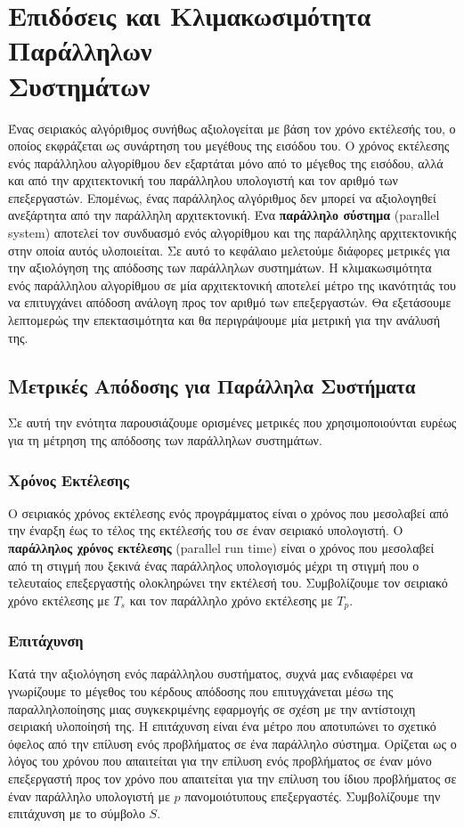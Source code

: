 \documentclass[12pt,a4paper]{article} %
\begin{document}
\section[Επιδόσεις και Κλιμακωσιμότητα Παράλληλων Συστημάτων]{Επιδόσεις και Κλιμακωσιμότητα Παράλληλων \protect\\ Συστημάτων}
Ένας σειριακός αλγόριθμος συνήθως αξιολογείται με βάση τον χρόνο εκτέλεσής 
του, ο οποίος εκφράζεται ως συνάρτηση του μεγέθους της εισόδου του. Ο 
χρόνος εκτέλεσης ενός παράλληλου αλγορίθμου δεν εξαρτάται μόνο από το 
μέγεθος της εισόδου, αλλά και από την αρχιτεκτονική του παράλληλου 
υπολογιστή και τον αριθμό των επεξεργαστών. Επομένως, ένας παράλληλος 
αλγόριθμος δεν μπορεί να αξιολογηθεί ανεξάρτητα από την παράλληλη 
αρχιτεκτονική. Ένα \textbf{παράλληλο σύστημα} 
(parallel system) αποτελεί τον συνδυασμό ενός 
αλγορίθμου και της παράλληλης αρχιτεκτονικής στην οποία αυτός υλοποιείται.
Σε αυτό το κεφάλαιο μελετούμε διάφορες μετρικές για την αξιολόγηση της 
απόδοσης των παράλληλων συστημάτων.
Η κλιμακωσιμότητα ενός παράλληλου αλγορίθμου σε μία αρχιτεκτονική
αποτελεί μέτρο της ικανότητάς του να επιτυγχάνει απόδοση ανάλογη προς τον 
αριθμό των επεξεργαστών. Θα εξετάσουμε λεπτομερώς την επεκτασιμότητα
και θα περιγράψουμε μία μετρική για την ανάλυσή της.

\subsection{Μετρικές Απόδοσης για Παράλληλα Συστήματα}
Σε αυτή την ενότητα παρουσιάζουμε ορισμένες μετρικές που χρησιμοποιούνται 
ευρέως για τη μέτρηση της απόδοσης των παράλληλων συστημάτων.

\subsubsection{Χρόνος Εκτέλεσης}
Ο σειριακός χρόνος εκτέλεσης ενός προγράμματος είναι ο χρόνος που 
μεσολαβεί από την έναρξη έως το τέλος της εκτέλεσής του σε έναν σειριακό 
υπολογιστή. Ο \textbf{παράλληλος χρόνος εκτέλεσης}
(parallel run time) είναι ο χρόνος που 
μεσολαβεί από τη στιγμή που ξεκινά ένας παράλληλος υπολογισμός μέχρι τη 
στιγμή που ο τελευταίος επεξεργαστής ολοκληρώνει την εκτέλεσή του.
Συμβολίζουμε τον σειριακό χρόνο εκτέλεσης με $T_s$ και τον παράλληλο 
χρόνο εκτέλεσης με $T_p$.

\subsubsection{Επιτάχυνση}
Κατά την αξιολόγηση ενός παράλληλου συστήματος, συχνά μας ενδιαφέρει να
γνωρίζουμε το μέγεθος του κέρδους απόδοσης που επιτυγχάνεται μέσω της
παραλληλοποίησης μιας συγκεκριμένης εφαρμογής σε σχέση με την αντίστοιχη
σειριακή υλοποίησή της. Η επιτάχυνση είναι ένα μέτρο που αποτυπώνει το
σχετικό όφελος από την επίλυση ενός προβλήματος σε ένα παράλληλο σύστημα.
Ορίζεται ως ο λόγος του χρόνου που απαιτείται για την επίλυση ενός
προβλήματος σε έναν μόνο επεξεργαστή προς τον χρόνο που απαιτείται για
την επίλυση του ίδιου προβλήματος σε έναν παράλληλο υπολογιστή με $p$
πανομοιότυπους επεξεργαστές. Συμβολίζουμε την επιτάχυνση με το σύμβολο $S$.
\end{document}
